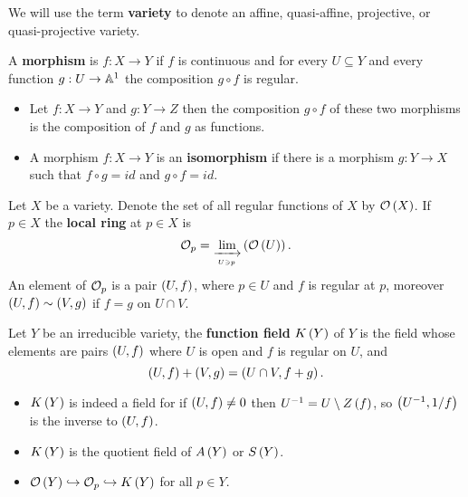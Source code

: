 \begin{definition}
We will use the term \textbf{variety} to denote an affine, quasi-affine, projective, or quasi-projective variety.
\end{definition}

\begin{definition}
A \textbf{morphism} is $ f : X \to Y $ if $ f $ is continuous and for every $ U \subseteq Y $ and every function $ g : U \to \mathbb{A}^1 $ the composition $ g \circ f $ is regular.
\end{definition}

\begin{remark}
\hfill
\begin{itemize}
\item Let $ f : X \to Y $ and $ g : Y \to Z $ then the composition $ g \circ f $ of these two morphisms is the composition of $ f $ and $ g $ as functions.
\item A morphism $ f : X \to Y $ is an \textbf{isomorphism} if there is a morphism $ g : Y \to X $ such that $ f \circ g = id $ and $ g \circ f = id $.
\end{itemize}
\end{remark}

\begin{definition}
Let $ X $ be a variety. Denote the set of all regular functions of $ X $ by $ \mathcal{O}\left( X \right) $. If $ p \in X $ the \textbf{local ring} at $ p \in X $ is
$$ \mathcal{O}_p = \lim_{\xrightarrow[U \ni p]{}}\left( \mathcal{O}\left( U \right) \right). $$
An element of $ \mathcal{O}_p $ is a pair $ \left( U, f \right) $, where $ p \in U $ and $ f $ is regular at $ p $, moreover $ \left( U, f \right) \sim \left( V, g \right) $ if $ f = g $ on $ U \cap V $.
\end{definition}

\pagebreak


\begin{definition}
Let $ Y $ be an irreducible variety, the \textbf{function field} $ K\left( Y \right) $ of $ Y $ is the field whose elements are pairs $ \left( U, f \right) $ where $ U $ is open and $ f $ is regular on $ U $, and
$$ \left( U, f \right) + \left( V, g \right) = \left( U \cap V, f + g \right). $$
\end{definition}

\begin{remark}
\hfill
\begin{itemize}
\item $ K\left( Y \right) $ is indeed a field for if $ \left( U, f \right) \ne 0 $ then $ U^{-1} = U \setminus Z\left( f \right) $, so $ \left( U^{-1}, 1 / f \right) $ is the inverse to $ \left( U, f \right) $.
\item $ K\left( Y \right) $ is the quotient field of $ A\left( Y \right) $ or $ S\left( Y \right) $.
\item $ \mathcal{O}\left( Y \right) \hookrightarrow \mathcal{O}_p \hookrightarrow K\left( Y \right) $ for all $ p \in Y $.
\end{itemize}
\end{remark}

